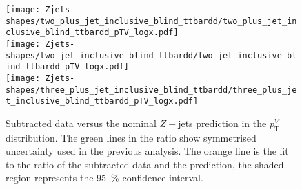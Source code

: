 \begin{figure}[ht]
  \centering
  \texttt{[image: Zjets-shapes/two\_plus\_jet\_inclusive\_blind\_ttbardd/two\_plus\_jet\_inclusive\_blind\_ttbardd\_pTV\_logx.pdf]}
  \\
  \vspace{-8mm}
  \texttt{[image: Zjets-shapes/two\_jet\_inclusive\_blind\_ttbardd/two\_jet\_inclusive\_blind\_ttbardd\_pTV\_logx.pdf]}
  \\
  \vspace{-8mm}
  \texttt{[image: Zjets-shapes/three\_plus\_jet\_inclusive\_blind\_ttbardd/three\_plus\_jet\_inclusive\_blind\_ttbardd\_pTV\_logx.pdf]}
  \caption[Subtracted data versus the nominal $Z+$jets prediction,
  $p_{\mathrm{T}}^V$.]{\footnotesize Subtracted data versus the nominal $Z+$jets prediction
    in the $p_{\mathrm{T}}^V$ distribution. The green lines in the ratio show symmetrised
    uncertainty used in the previous analysis. The orange line is the fit to the
    ratio of the subtracted data and the prediction, the shaded region represents
    the 95~\% confidence interval.}
  \label{fig:zjets-ptv-shapes}
\end{figure}